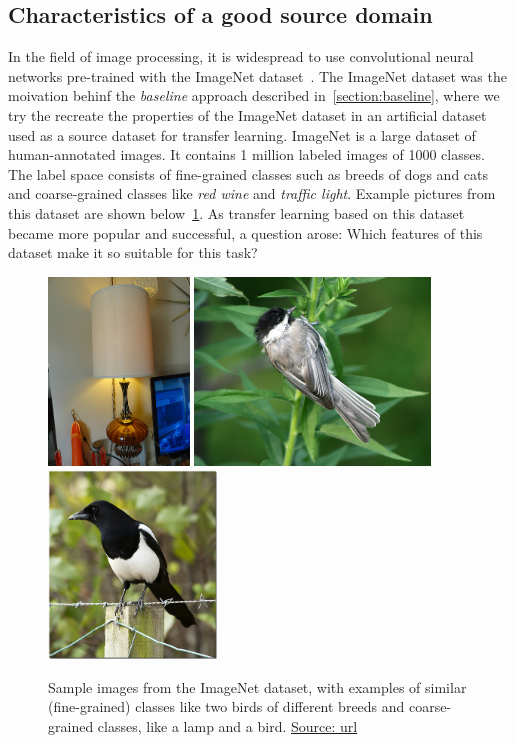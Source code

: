 \documentclass[a4paper,11pt,twoside]{report}
\theoremstyle{definition}
\begin{document}
\subsection{Characteristics of a good source domain}

In the field of image processing, it is widespread to use convolutional neural networks \mbox{pre-trained} with the ImageNet dataset~\cite{imagnet}. The ImageNet dataset was the moivation behinf the \textit{baseline} approach described in~\ref{section:baseline}, where we try the recreate the properties of the ImageNet dataset in an artificial dataset used as a source dataset for transfer learning.  ImageNet is a large dataset of human-annotated images. It contains 1 million labeled images of 1000 classes. The label space consists of fine-grained classes such as breeds of dogs and cats and coarse-grained classes like \textit{red wine} and \textit{traffic light}. Example pictures from this dataset are shown below~\ref{fig:image_net}. As transfer learning based on this dataset became more popular and successful, a question arose: Which features of this dataset make it so suitable for this task?
\FloatBarrier

\begin{figure}[h!]
\centering
\includegraphics[height=5cm]{imgs/lamp.jpeg}
\includegraphics[height=5cm]{imgs/bird1.jpeg}
\includegraphics[height=5cm]{imgs/bird2.jpeg}
\caption{Sample images from the ImageNet dataset, with examples of similar (fine-grained) classes like two birds of different breeds and coarse-grained classes, like a lamp and a bird. \href{https://www.kaggle.com/competitions/imagenet-object-localization-challenge/data}{Source: url}}
\label{fig:image_net}
\end{figure}
\end{document}
